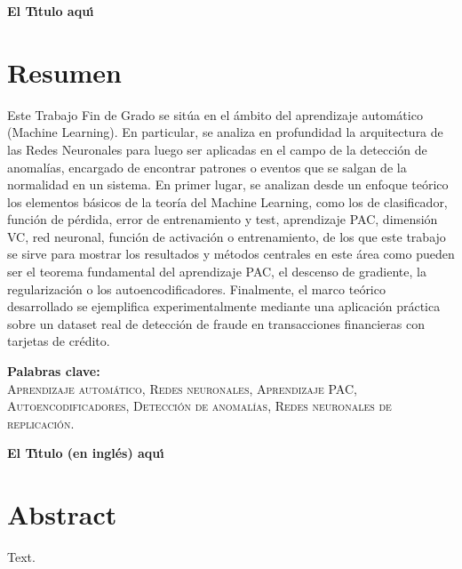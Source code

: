 \documentclass[a4paper, 12pt, oneside]{book}
\begin{document}
\tableofcontents


\pagebreak

{\let\clearpage\relax

{\Large \textbf{El T\'{\i}tulo aqu\'{\i}}}\\

\chapter*{Resumen}
} 
Este Trabajo Fin de Grado se sitúa en el ámbito del aprendizaje automático
(Machine Learning). En particular, se analiza en profundidad la arquitectura de
las Redes Neuronales para luego ser aplicadas en el campo de la detección
de anomalías, encargado de encontrar patrones o eventos que se salgan de la
normalidad en un sistema.
En primer lugar, se analizan desde un enfoque teórico los elementos básicos
de la teoría del Machine Learning, como los de clasificador, función de pérdida,
error de entrenamiento y test, aprendizaje PAC, dimensión VC, red neuronal, función de activación o entrenamiento, de los que este trabajo se sirve para mostrar
los resultados y métodos centrales en este área como pueden ser el teorema
fundamental del aprendizaje PAC, el descenso de gradiente, la regularización o
los autoencodificadores.
Finalmente, el marco teórico desarrollado se ejemplifica experimentalmente
mediante una aplicación práctica sobre un dataset real de detección de fraude
en transacciones financieras con tarjetas de crédito.


\vfill

\textbf{Palabras clave:}\\

\textsc{Aprendizaje automático, Redes neuronales, Aprendizaje PAC,
Autoencodificadores, Detección de anomalías, Redes neuronales de replicación.
}

\pagebreak

{\let\clearpage\relax

{\Large \textbf{El T\'{\i}tulo (en ingl\'{e}s) aqu\'{\i}}}\\

\chapter*{Abstract}
}

Text. 
\end{document}
